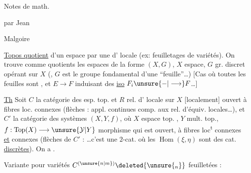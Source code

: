 
Notes de math.\par
{} par Jean\par
Malgoire


\uline{Topos quotient} d'un espace  par une
 d' locale 
(ex: feuilletages de variétés). On trouve comme
quotients les espaces de la forme $(X,G)$, $X$ espace, $G$ gr. 
discret opérant sur $X$ (,
$G$ est le groupe fondamental d'une ``feuille''\ldots)
[Cas où toutes les feuilles  sont ,
et  $E\longrightarrow F$ induisant des
\uline{iso} $F_i\unsure{-|\longrightarrow}F$\ldots]



\uline{Th} Soit $C$ la catégorie des 
esp. top.  et $R$ rel. d'
locale sur $X$ [localement] ouvert à fibres loc.
connexes  
(flèches : appl. continues comp. aux rel.
d'équiv. locales\ldots), et $C'$ la catégorie des
  systèmes $(X,Y,f)$,
où $X$ espace top. ,
$Y$ mult. top., $f:\operatorname{Top}(X)\longrightarrow\unsure{\mathcal{Y}|Y}$
morphisme qui est  ouvert,
à fibres loc\textsuperscript{t} connexes \uline{et}
connexes (flèches de $C'$ : \ldots c'est une $2$-cat.
où les \uline{$\operatorname{Hom}$}$(\xi,\eta)$ sont des cat. \uline{discrètes}). On a
.


Variante pour variétés 
$C^{(\unsure{n|m})}\deleted{\unsure{{}_{n}}}$ feuilletées :

